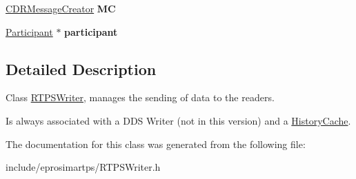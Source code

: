 \begin{DoxyCompactItemize}
\item 
\hypertarget{classeprosima_1_1rtps_1_1_r_t_p_s_writer_a71d2748f406319adc16e7a555410a77b}{\hyperlink{classeprosima_1_1rtps_1_1_c_d_r_message_creator}{\-C\-D\-R\-Message\-Creator} {\bfseries \-M\-C}}\label{classeprosima_1_1rtps_1_1_r_t_p_s_writer_a71d2748f406319adc16e7a555410a77b}

\item 
\hypertarget{classeprosima_1_1rtps_1_1_r_t_p_s_writer_a9779ace2514f8df4a132c30030e1c9db}{\hyperlink{classeprosima_1_1rtps_1_1_participant}{\-Participant} $\ast$ {\bfseries participant}}\label{classeprosima_1_1rtps_1_1_r_t_p_s_writer_a9779ace2514f8df4a132c30030e1c9db}

\end{DoxyCompactItemize}


\subsection{\-Detailed \-Description}
\-Class \hyperlink{classeprosima_1_1rtps_1_1_r_t_p_s_writer}{\-R\-T\-P\-S\-Writer}, manages the sending of data to the readers. 

\-Is always associated with a \-D\-D\-S \-Writer (not in this version) and a \hyperlink{classeprosima_1_1rtps_1_1_history_cache}{\-History\-Cache}. 

\-The documentation for this class was generated from the following file\-:\begin{DoxyCompactItemize}
\item 
include/eprosimartps/\-R\-T\-P\-S\-Writer.\-h\end{DoxyCompactItemize}
